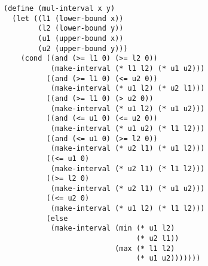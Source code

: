 \documentclass[a4paper,12pt]{article}
\begin{document}
\begin{lstlisting}
(define (mul-interval x y)
  (let ((l1 (lower-bound x))
        (l2 (lower-bound y))
        (u1 (upper-bound x))
        (u2 (upper-bound y)))
    (cond ((and (>= l1 0) (>= l2 0))
           (make-interval (* l1 l2) (* u1 u2)))
          ((and (>= l1 0) (<= u2 0))
           (make-interval (* u1 l2) (* u2 l1)))
          ((and (>= l1 0) (> u2 0))
           (make-interval (* u1 l2) (* u1 u2)))
          ((and (<= u1 0) (<= u2 0))
           (make-interval (* u1 u2) (* l1 l2)))
          ((and (<= u1 0) (>= l2 0))
           (make-interval (* u2 l1) (* u1 l2)))
          ((<= u1 0)
           (make-interval (* u2 l1) (* l1 l2)))
          ((>= l2 0)
           (make-interval (* u2 l1) (* u1 u2)))
          ((<= u2 0)
           (make-interval (* u1 l2) (* l1 l2)))
          (else
           (make-interval (min (* u1 l2)
                               (* u2 l1))
                          (max (* l1 l2)
                               (* u1 u2)))))))
\end{lstlisting}
\end{document}

